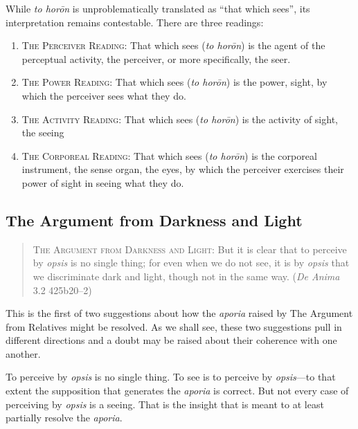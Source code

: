 While \emph{to horōn} is unproblematically translated as ``that which sees'', its interpretation remains contestable. There are three readings:
\begin{enumerate}[(1)]
	\item \textsc{The Perceiver Reading}: That which sees (\emph{to horōn}) is the agent of the perceptual activity, the perceiver, or more specifically, the seer.
	\item \textsc{The Power Reading}: That which sees (\emph{to horōn}) is the power, sight, by which the perceiver sees what they do.
	\item \textsc{The Activity Reading}: That which sees (\emph{to horōn}) is the activity of sight, the seeing
	\item \textsc{The Corporeal Reading}: That which sees (\emph{to horōn}) is the corporeal instrument, the sense organ, the eyes, by which the perceiver exercises their power of sight in seeing what they do.
\end{enumerate}


\subsection{The Argument from Darkness and Light} %
\label{sub:the_argument_from_darkness}

\begin{quote}
	\textsc{The Argument from Darkness and Light}: But it is clear that to perceive by \emph{opsis} is no single thing; for even when we do not see, it is by \emph{opsis} that we discriminate dark and light, though not in the same way. (\emph{De Anima} 3.2 425b20–2)
\end{quote}

This is the first of two suggestions about how the \emph{aporia} raised by The Argument from Relatives might be resolved. As we shall see, these two suggestions pull in different directions and a doubt may be raised about their coherence with one another.


To perceive by \emph{opsis} is no single thing. To see is to perceive by \emph{opsis}—to that extent the supposition that generates the \emph{aporia} is correct. But not every case of perceiving by \emph{opsis} is a seeing. That is the insight that is meant to at least partially resolve the \emph{aporia}.


